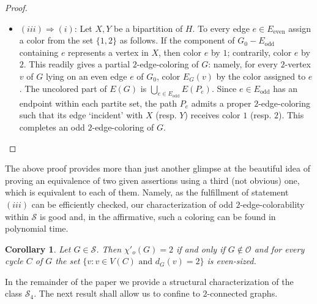 \documentclass[a4paper,12pt]{article}
\newtheorem{corollary}[theorem]{Corollary}
\numberwithin{equation}{section}
\begin{document}
\begin{proof}
\begin{itemize}
\item $(iii)\Rightarrow(i)$: Let $X,Y$ be a bipartition of $H$. To every edge $e\in E_{\mathrm{even}}$ assign a color from the set $\{1,2\}$ as follows. If the component of $G_0-E_{\mathrm{odd}}$ containing $e$ represents a vertex in $X$, then color $e$ by $1$; contrarily, color $e$ by $2$. This readily gives a partial $2$-edge-coloring of $G$: namely, for every $2$-vertex $v$ of $G$ lying on an even edge $e$ of $G_0$, color $E_G(v)$ by the color assigned to $e$. The uncolored part of $E(G)$ is $\bigcup_{e\in E_{\mathrm{odd}}} E(P_e)$. Since $e\in E_{\mathrm{odd}}$ has an endpoint within each partite set, the path $P_e$ admits a proper $2$-edge-coloring such that its edge `incident' with $X$ (resp. $Y$) receives color $1$ (resp. $2$). This completes an odd $2$-edge-coloring of $G$.
\end{itemize}
\end{proof}

The above proof provides more than just another glimpse at the beautiful idea of proving an equivalence of two given assertions using a third (not obvious) one, which is equivalent to each of them. Namely, as the fulfillment of statement $(iii)$ can be efficiently checked, our characterization of odd $2$-edge-colorability within $\mathcal{S}$ is good and, in the affirmative, such a coloring can be found in polynomial time.

\begin{corollary}
    \label{odd 2-edge-colorability}
Let $G\in\mathcal{S}$. Then $\chi'_o(G)=2$ if and only if $G\notin\mathcal{O}$ and for every cycle $C$ of $G$ the set $\{v:v\in V(C) \text{ and } d_G(v)=2\}$ is even-sized.
\end{corollary}

In the remainder of the paper we provide a structural characterization of the class $\mathcal{S}_4$. The next result shall allow us to confine to $2$-connected graphs.
\end{document}
